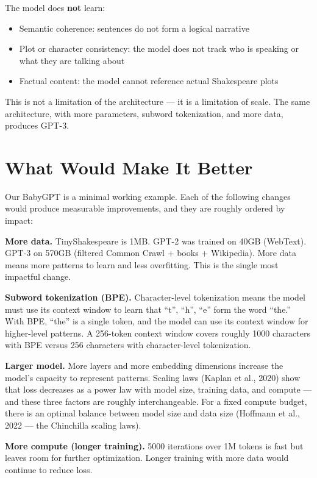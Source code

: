 The model does \textbf{not} learn:

\begin{itemize}
  \item Semantic coherence: sentences do not form a logical narrative
  \item Plot or character consistency: the model does not track who is speaking or what they are talking about
  \item Factual content: the model cannot reference actual Shakespeare plots
\end{itemize}

This is not a limitation of the architecture --- it is a limitation of scale. The same architecture, with more parameters, subword tokenization, and more data, produces GPT-3.

\section{What Would Make It Better}

Our BabyGPT is a minimal working example. Each of the following changes would produce measurable improvements, and they are roughly ordered by impact:

\textbf{More data.} TinyShakespeare is 1MB. GPT-2 was trained on 40GB (WebText). GPT-3 on 570GB (filtered Common Crawl + books + Wikipedia). More data means more patterns to learn and less overfitting. This is the single most impactful change.

\textbf{Subword tokenization (BPE).} Character-level tokenization means the model must use its context window to learn that ``t'', ``h'', ``e'' form the word ``the.'' With BPE, ``the'' is a single token, and the model can use its context window for higher-level patterns. A 256-token context window covers roughly 1000 characters with BPE versus 256 characters with character-level tokenization.

\textbf{Larger model.} More layers and more embedding dimensions increase the model's capacity to represent patterns. Scaling laws (Kaplan et al., 2020) show that loss decreases as a power law with model size, training data, and compute --- and these three factors are roughly interchangeable. For a fixed compute budget, there is an optimal balance between model size and data size (Hoffmann et al., 2022 --- the Chinchilla scaling laws).

\textbf{More compute (longer training).} 5000 iterations over 1M tokens is fast but leaves room for further optimization. Longer training with more data would continue to reduce loss.

